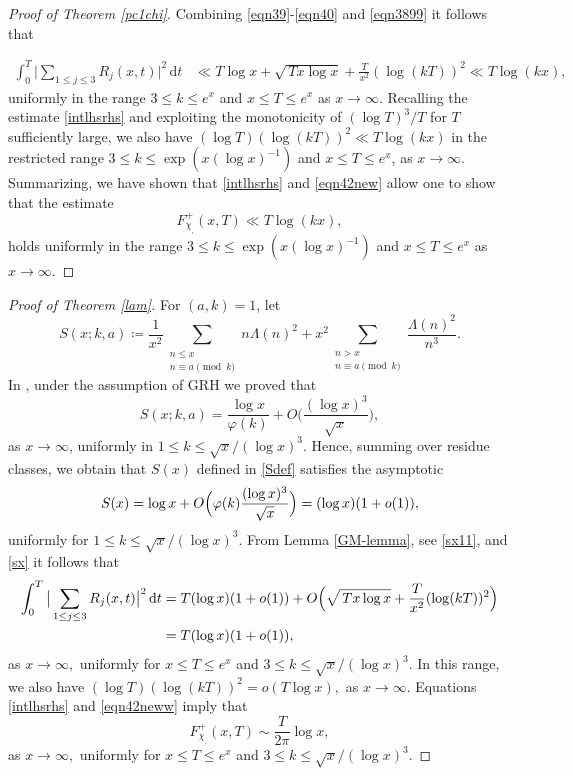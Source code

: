 \documentclass[pdflatex]{sn-jnl}%
\newcommand{\dx}{\mathrm{d}}
\theoremstyle{sltheorems}
\theoremstyle{plainrem}
\theoremstyle{definition}
\begin{document}
\begin{proof}[Proof of Theorem \ref{pc1chi}]
Combining \eqref{eqn39}-\eqref{eqn40} and \eqref{eqn3899} it follows that

\begin{align}\label{eqn42new}
  \int_{0}^T \big \vert \sum_{1\le  j \le  3} R_j(x,t)\big \vert ^2 \, \dx t & \ll
 T \log x + \sqrt{\,Tx\log x} +
  \frac{T}{x^2} (\log (kT))^2
  \ll  T \log (kx),
 \end{align}
\noindent
uniformly in the range $3\le k \le e^x$ and
$x \le T \le e^x$ as $x \to \infty.$
Recalling the estimate \eqref{intlhsrhs} and exploiting the monotonicity of $(\log T)^3/ T$  for $T$ sufficiently large, we also have
$ (\log T)(\log (kT))^2 \ll T \log (kx)$
in the restricted range $3 \leq k \le \exp(x (\log x)^{-1})$ and $x \le T \le e^x$,
as $x \to \infty$.
Summarizing, we have shown that \eqref{intlhsrhs} and \eqref{eqn42new} allow one to show that the estimate
\[
   F^+_{\chi_{_\square}}(x,T)  \ll  T  \log (kx),
\]
holds uniformly in the range $3 \leq k \le \exp(x (\log x)^{-1})$
and $x \le T \le e^x$  as $x \to \infty.$
\end{proof}



\begin{proof}[Proof of Theorem \ref{lam}]
 
For $(a,k)= 1$, let 
\[
S(x;k,a) \coloneq \frac{1}{x^2}
 \sum_{\substack{n \leq x \\
 n \equiv a \pmod{k}}} n \Lambda(n)^2 +
x^2 \sum_{\substack{n > x \\ \nonumber
 n \equiv a \pmod{k}}}\frac{\Lambda(n)^2}{n^3}.
\]
In \cite[eqn (35)]{mathannalen}, under the assumption of GRH we proved that
\[
S(x;k,a) = \frac{\log x}{\varphi(k)} + O \Big(\frac{(\log x)^3} {\sqrt{x}}  \Big),
\]
as $x \to \infty$, uniformly in $1\le k \leq \sqrt{x}/(\log x)^{3}$.
Hence, summing over residue classes, we obtain
that $S(x)$ defined in \eqref{Sdef} satisfies the asymptotic
\begin{equation}\label{sx}
    S(x)  = \log x + O\Bigl(\varphi(k) \frac{(\log x)^3}{\sqrt{x}}\Bigr)
    = (\log x)(1+o(1)),
\end{equation}
uniformly for $1\le k \le \sqrt{x}/(\log x)^3$.
%
From Lemma \ref{GM-lemma}, see \eqref{sx11}, and \eqref{sx} it follows that
\begin{align}\label{eqn42neww}
  \int_{0}^T \big \vert \sum_{1\le  j \le  3} R_j(x,t)\big \vert ^2 \, \dx t & =
T (\log x)(1+o(1)) + O\Bigr(\sqrt{\,Tx\log x} +
  \frac{T}{x^2} (\log (kT))^2\Bigl)
  \nonumber\\ &
  = T (\log x)(1+o(1)),
 \end{align}
 as $x \to \infty,$
uniformly for
 $ x \leq T \leq e^x$ and $3 \leq k \leq \sqrt{x}/(\log x)^{3}$.
 In this range, we also have
   $ (\log T)(\log (kT))^2 = o(T \log x),$
   as $x \to \infty$.
 Equations \eqref{intlhsrhs} and \eqref{eqn42neww} imply that
\begin{equation}\nonumber
   F^+_{\chi_{_\square}}(x,T)  \sim  \frac{T }{2\pi} \log x,
\end{equation}
as $x \to \infty,$
uniformly for $ x \leq T \leq e^x$ and $3 \leq k \leq \sqrt{x}/(\log x)^{3}.$
\end{proof}
\end{document}
